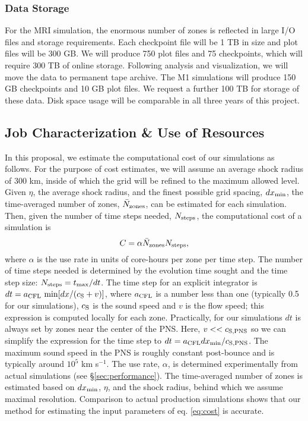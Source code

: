 \subsubsection{Data Storage}
For the MRI simulation, the enormous number of zones is reflected
in large I/O files and storage requirements.  Each checkpoint file
will be 1 TB in size and plot files will be 300 GB.  We will produce
750 plot files and 75 checkpoints, which will require 300 TB of online
storage.  Following analysis and visualization, we will move the data
to permanent tape archive.
The M1 simulations will produce 150 GB checkpoints and 10 GB plot files.
We request a further 100 TB for storage of these data.
Disk space usage will be comparable in all three years of this project.

\subsection{Job Characterization \& Use of Resources}
\label{sec:jobs}

In this proposal, we estimate the computational cost of our
simulations as follows.  For the purpose of cost estimates, we will
assume an average shock radius of 300 km, inside of which the grid
will be refined to the maximum allowed level.   Given $\eta$, the
average shock radius, and the finest possible grid spacing, $d
x_{\rm min}$, the time-averaged number of zones, $\bar N_{\rm zones}$,
can be estimated for each simulation.  Then, given the number of time
steps needed, $N_{\rm steps}$, the computational cost of a simulation
is
\begin{equation}
C = \alpha   \bar N_{\rm zones} N_{\rm steps},
\label{eq:cost}
\end{equation}
where $\alpha$ is the use rate in units of core-hours per zone per
time step.
The number of time steps needed is determined by the
evolution time sought and the time step size: $N_{\rm steps} = t_{\rm
  max} / d t$.
The time step for an explicit integrator is $d t = a_{\rm CFL}\ {\rm min}[d x / (c_{\rm S} + v)]$, where $a_{\rm CFL}$ is a number less than one (typically 0.5 for our simulations), $c_{\rm S}$ is the sound speed and $v$ is the flow speed; this expression is computed locally for each zone.
Practically, for our simulations $d t$ is always set by zones near the center of the PNS.  Here, $v << c_{\rm S,PNS}$ so we can simplify the expression for the time step to $d t = a_{\rm CFL} d x_{\rm
  min} / c_{\rm S,PNS}$. The maximum sound speed in the PNS is roughly
constant post-bounce and is typically around $10^5$ km s$^{-1}$.
The use rate, $\alpha$, is determined experimentally from actual simulations (see \S\ref{sec:performance}).  The time-averaged number of zones is estimated based on $d x_{\rm min}$, $\eta$, and the shock radius, behind which we assume maximal resolution.  Comparison to actual production simulations shows that our method for estimating the input parameters of eq. \ref{eq:cost} is accurate.


